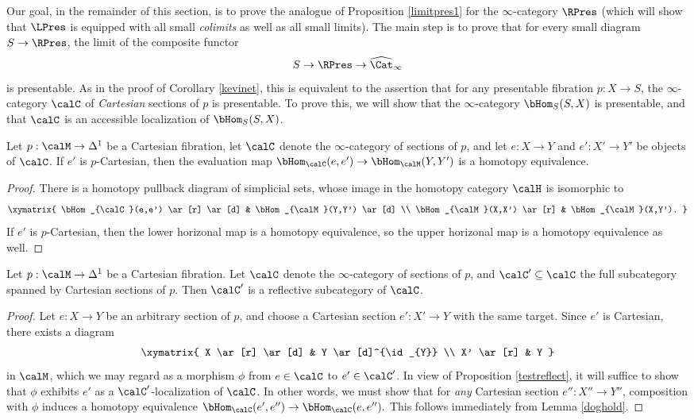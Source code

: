 Our goal, in the remainder of this section, is to prove the analogue of Proposition \ref{limitpres1} for the $\infty$-category $\RPres$ (which will show that $\LPres$ is equipped with all small {\em colimits} as well as all small limits). The main step is to prove that for every small diagram
$S \rightarrow \RPres$, the limit of the composite functor
$$ S \rightarrow \RPres \rightarrow \widehat{\Cat}_{\infty}$$
is presentable. As in the proof of Corollary \ref{kevinet}, this is equivalent to the assertion
that for any presentable fibration $p: X \rightarrow S$, the $\infty$-category $\calC$ of {\em Cartesian} sections of $p$ is presentable. To prove this, we will show that the $\infty$-category $\bHom_{S}(S,X)$ is presentable, and that $\calC$ is an accessible localization of $\bHom_{S}(S,X)$.

\begin{lemma}\label{doghold}
Let $p: \calM \rightarrow \Delta^1$ be a Cartesian fibration, let $\calC$
denote the $\infty$-category of sections of $p$, and let
$e: X \rightarrow Y$ and $e': X' \rightarrow Y'$ be objects of $\calC$. If
$e'$ is $p$-Cartesian, then the evaluation map
$\bHom_{\calC}( e,e') \rightarrow \bHom_{\calM}(Y,Y')$
is a homotopy equivalence.
\end{lemma}

\begin{proof}
There is a homotopy pullback diagram of simplicial sets, whose image in the homotopy
category $\calH$ is isomorphic to
$$ \xymatrix{ \bHom_{\calC}(e,e') \ar[r] \ar[d] & \bHom_{\calM}(Y,Y') \ar[d] \\
\bHom_{\calM}(X,X') \ar[r] & \bHom_{\calM}(X,Y'). }$$
If $e'$ is $p$-Cartesian, then the lower horizonal map is a homotopy equivalence, so the upper horizonal map is a homotopy equivalence as well.
\end{proof}

\begin{lemma}\label{cathold}
Let $p: \calM \rightarrow \Delta^1$ be a Cartesian fibration. Let
$\calC$ denote the $\infty$-category of sections of $p$, and $\calC' \subseteq \calC$ the full subcategory spanned by Cartesian sections of $p$. Then $\calC'$ is a reflective subcategory of $\calC$.
\end{lemma}

\begin{proof}
Let $e: X \rightarrow Y$ be an arbitrary section of $p$, and choose a Cartesian section
$e': X' \rightarrow Y$ with the same target. Since $e'$ is Cartesian, there exists a diagram
$$ \xymatrix{ X \ar[r] \ar[d] & Y \ar[d]^{\id_{Y}} \\
X' \ar[r] & Y }$$
in $\calM$, which we may regard as a morphism $\phi$ from $e \in \calC$ to $e' \in \calC'$. 
In view of Proposition \ref{testreflect}, it will suffice to show that $\phi$ exhibits
$e'$ as a $\calC'$-localization of $\calC$. In other words, we must show that for {\em any}
Cartesian section $e'': X'' \rightarrow Y''$, composition with $\phi$ induces a
homotopy equivalence
$\bHom_{\calC}( e', e'') \rightarrow \bHom_{\calC}(e,e'').$
This follows immediately from Lemma \ref{doghold}.
\end{proof}


